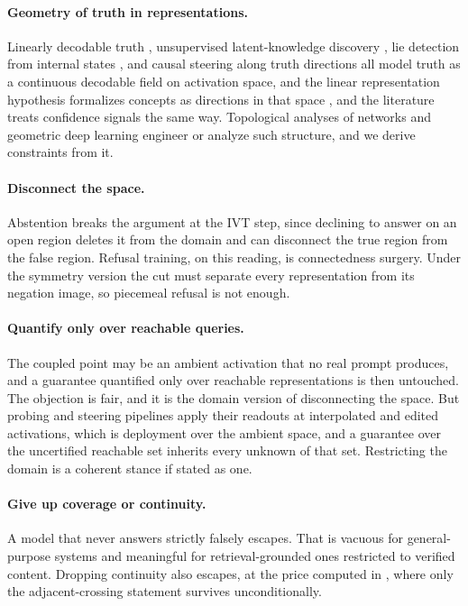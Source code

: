 \documentclass[mlmain,onecolumn]{jmlr}
\begin{document}
\paragraph{Geometry of truth in representations.}
Linearly decodable truth \citep{marks2024geometry}, unsupervised
latent-knowledge discovery \citep{burns2023discovering}, lie
detection from internal states \citep{azaria2023internal}, and
causal steering along truth directions
\citep{li2023inference,zou2023representation} all model truth as a
continuous decodable field on activation space, and the linear
representation hypothesis formalizes concepts as directions in that
space \citep{park2024linear}, and the literature treats confidence
signals \citep{farquhar2024detecting,kadavath2022language} the same
way. Topological analyses of networks
\citep{naitzat2020topology,hensel2021survey} and geometric deep
learning \citep{bronstein2021geometric} engineer or analyze such
structure, and we derive constraints from it.

\paragraph{Disconnect the space.}
Abstention breaks the argument at the IVT step, since declining to
answer on an open region deletes it from the domain and can
disconnect the true region from the false region. Refusal training,
on this reading, is connectedness surgery. Under the symmetry
version the cut must separate every representation from its
negation image, so piecemeal refusal is not enough.

\paragraph{Quantify only over reachable queries.}
The coupled point may be an ambient activation that no real prompt
produces, and a guarantee quantified only over reachable
representations is then untouched. The objection is fair, and it is
the domain version of disconnecting the space. But probing and
steering pipelines apply their readouts at interpolated and edited
activations, which is deployment over the ambient space, and a
guarantee over the uncertified reachable set inherits every unknown
of that set. Restricting the domain is a coherent stance if stated
as one.

\paragraph{Give up coverage or continuity.}
A model that never answers strictly falsely escapes. That is
vacuous for general-purpose systems and meaningful for
retrieval-grounded ones restricted to verified content. Dropping
continuity also escapes, at the price computed in
, where only the adjacent-crossing
statement survives unconditionally.
\end{document}
